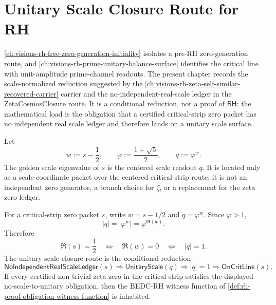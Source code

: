 \chapter{Unitary Scale Closure Route for RH}
\label{ch:visions-rh-unitary-scale-closure-route}

\autoref{ch:visions-rh-free-zero-generation-initiality} isolates a
pre-RH zero-generation route, and
\autoref{ch:visions-rh-prime-unitary-balance-surface} identifies the
critical line with unit-amplitude prime-channel readouts. The present
chapter records the scale-normalized reduction suggested by the
\autoref{ch:visions-rh-zeta-self-similar-recovered-carrier} carrier and
the no-independent-real-scale ledger in the
ZetaCosmosClosure route. It is a conditional reduction, not a proof of
$\mathsf{RH}$: the mathematical load is the obligation that a certified
critical-strip zero packet has no independent real scale ledger and
therefore lands on a unitary scale surface.

\begin{definition}
\label{def:rh-golden-scale-eigenvalue}
Let
$$
w:=s-\frac{1}{2},
\qquad
\varphi:=\frac{1+\sqrt{5}}{2},
\qquad
q:=\varphi^{w}.
$$
The golden scale eigenvalue of $s$ is the centered scale readout $q$.
It is located only as a scale-coordinate packet over the centered
critical-strip route; it is not an independent zero generator, a branch
choice for $\zeta$, or a replacement for the zeta zero ledger.
\end{definition}

\begin{principle}
\label{prin:rh-unitary-scale-closure-reduction}
For a critical-strip zero packet $s$, write $w=s-1/2$ and
$q=\varphi^w$. Since $\varphi>1$,
$$
|q|
=
|\varphi^w|
=
\varphi^{\Re(w)}.
$$
Therefore
$$
\Re(s)=\frac{1}{2}
\quad\Longleftrightarrow\quad
\Re(w)=0
\quad\Longleftrightarrow\quad
|q|=1.
$$
The unitary scale closure route is the conditional reduction
$$
\mathsf{NoIndependentRealScaleLedger}(s)
\Longrightarrow
\mathsf{UnitaryScale}(q)
\Longrightarrow
|q|=1
\Longrightarrow
\mathsf{OnCritLine}(s).
$$
If every certified non-trivial zeta zero in the critical strip satisfies
the displayed no-scale-to-unitary obligation, then the BEDC-RH witness
function of \autoref{def:rh-proof-obligation-witness-function} is
inhabited.
\end{principle}

